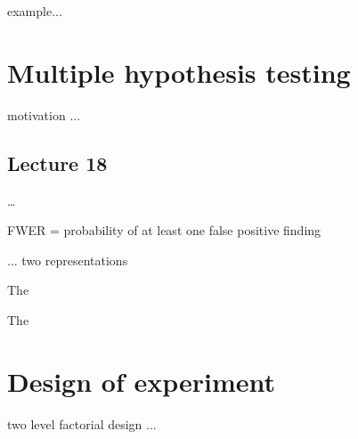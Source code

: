 example...

\newpage\section{Multiple hypothesis testing}


motivation ...

\subsection*{Lecture 18}

\dots


FWER = probability of at least one false positive finding


... two representations 


The 

  

The 










\newpage\section{Design of experiment}
two level factorial design ... 